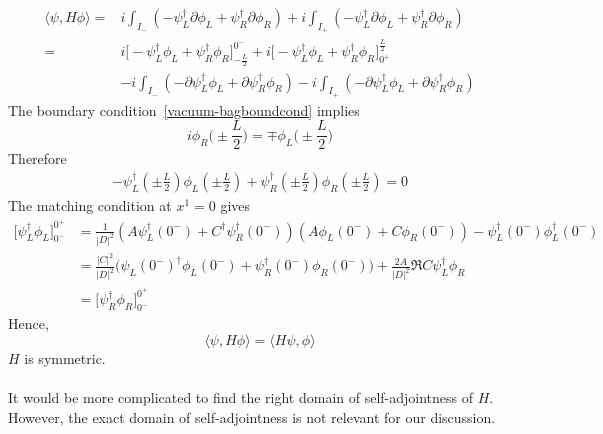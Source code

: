 \begin{equation}\label{sa-hamiltonian}
\begin{split}
\langle \psi, H \phi \rangle = & i \int_{I_-} ( - \psi_L^\dagger \partial \phi_L + \psi_R^\dagger \partial \phi_R )
+ i \int_{I_+} ( - \psi_L^\dagger \partial \phi_L + \psi_R^\dagger \partial \phi_R ) \\
= & i \big[-\psi_L^\dagger \phi_L + \psi_R^\dagger \phi_R \big]^{0^-}_{-\frac{L}{2}} + i \big[-\psi_L^\dagger \phi_L + \psi_R^\dagger \phi_R \big]_{0^+}^{\frac{L}{2}} \\
& - i \int_{I_-} ( - \partial \psi_L^\dagger \phi_L + \partial \psi_R^\dagger  \phi_R ) - i \int_{I_+} ( - \partial \psi_L^\dagger \phi_L + \partial \psi_R^\dagger  \phi_R ) 
\end{split}
\end{equation}
The boundary condition~\cref{vacuum-bagboundcond} implies
\begin{equation*}
i\phi_R \big(\pm \frac L 2) = \mp\phi_L\big(\pm\frac L 2\big)
\end{equation*}
Therefore
\begin{equation*}
\begin{split}
- \psi_L^\dagger(\pm \frac{L}{2}) \phi_L(\pm \frac{L}{2}) + \psi_R^\dagger(\pm \frac{L}{2}) \phi_R(\pm \frac{L}{2}) = 
0
\end{split}
\end{equation*}
The matching condition at $x^1 = 0$ gives
\begin{equation*}
\begin{split}
\big[ \psi^\dagger_L\phi_L] ^{0^+}_{0^-} & = \frac{1}{|D|^2}(A \psi_L^\dagger(0^-) + C^\dagger\psi^\dagger_R(0^-))(A \phi_L(0^-) + C\phi_R(0^-)) - \psi^\dagger_L(0^-)\phi^\dagger_L(0^-) \\
& = \frac{|C|^2}{|D|^2}\big(\psi_L(0^-)^\dagger\phi_L(0^-) + \psi_R^\dagger(0^-) \phi_R(0^-)\big) +
\frac{2A}{|D|^2}\Re{C\psi_L^\dagger \phi_R} \\
& = \big[ \psi^\dagger_R\phi_R] ^{0^+}_{0^-}
\end{split}
\end{equation*}
Hence, 
\begin{equation*}
\langle \psi, H \phi \rangle = \langle H \psi , \phi \rangle
\end{equation*}
$H$ is symmetric. 
\\\\
It would be more complicated to find the right domain of self-adjointness of $H$.
However, the exact domain of self-adjointness is not relevant for our discussion.
